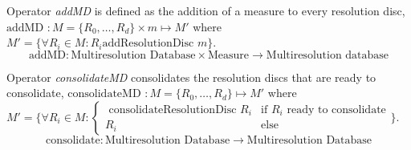 Operator \emph{addMD} is defined as the addition of a measure to every
resolution disc, $\text{addMD } : M=\{R_0,\dotsc,R_d\} \times m
\mapsto M' $ where $M'= \{ \forall R_i\in M: R_i \text{
  addResolutionDisc } m \}$.
\[
\text{addMD}: \text{Multiresolution Database} \times \text{Measure}
\longrightarrow \text{Multiresolution database}
\]


Operator \emph{consolidateMD} consolidates the resolution discs that
are ready to consolidate, $\text{consolidateMD } :
M=\{R_0,\dotsc,R_d\} \mapsto M'$ where $ M'= \big\{ \forall R_i\in M:
  \begin{cases}
    \text{ consolidateResolutionDisc } R_i & \text{if } R_i \text{ ready to consolidate} \\
    R_i & \text{else }
  \end{cases}\big\}
  $.
\[
\text{consolidate}: \text{Multiresolution Database} \longrightarrow
\text{Multiresolution Database}
  \]







